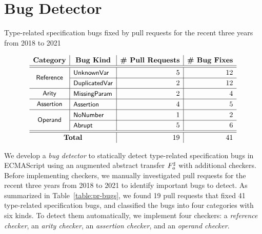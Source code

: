 \section{Bug Detector}\label{sec:checker}

\begin{table}
  \centering
  \caption{Type-related specification bugs fixed by pull requests for the recent
  three years from 2018 to 2021}
  \label{table:pr-bugs}
  \vspace*{-1em}
  \[
\renewcommand{\arraystretch}{1.2}
    \begin{array}{c|l|r|r}
      \multicolumn{1}{c|}{\textbf{Category}} &
      \multicolumn{1}{c|}{\textbf{Bug Kind}} &
      \multicolumn{1}{c|}{\textbf{\# Pull Requests}} &
      \multicolumn{1}{c}{\textbf{\# Bug Fixes}}\\
      \hline \hline

      \multirow{2}{*}{\stextsf{\footnotesize Reference}}
      & \stextsf{\footnotesize UnknownVar} & 5 & 12\\\cline{2-4}
      & \stextsf{\footnotesize DuplicatedVar} & 2 & 12\\\hline

      \multirow{1}{*}{\stextsf{\footnotesize Arity}}
      & \stextsf{\footnotesize MissingParam} & 2 & 4\\\hline

      \multirow{1}{*}{\stextsf{\footnotesize Assertion}}
      & \stextsf{\footnotesize Assertion} & 4 & 5\\\hline

      \multirow{2}{*}{\stextsf{\footnotesize Operand}}
      & \stextsf{\footnotesize NoNumber} & 1 & 2\\\cline{2-4}
      & \stextsf{\footnotesize Abrupt} & 5 & 6\\\hline \hline

      \multicolumn{2}{c|}{\textbf{Total}} & 19 & 41\\

    \end{array}
  \]
  \vspace*{-1.5em}
\end{table}

We develop a \textit{bug detector} to statically detect type-related
specification bugs in ECMAScript using an augmented abstract transfer
${F}^\sharp_a$ with additional checkers.  Before implementing checkers, we manually
investigated pull requests for the recent three years from 2018 to 2021 to identify
important bugs to detect.  As summarized in Table~\ref{table:pr-bugs},
we found 19 pull requests that fixed 41 type-related specification bugs,
and classified the bugs into four categories with six kinds.
To detect them automatically, we implement four checkers:
a \textit{reference checker}, an \textit{arity checker},
an \textit{assertion checker}, and an \textit{operand checker}.

